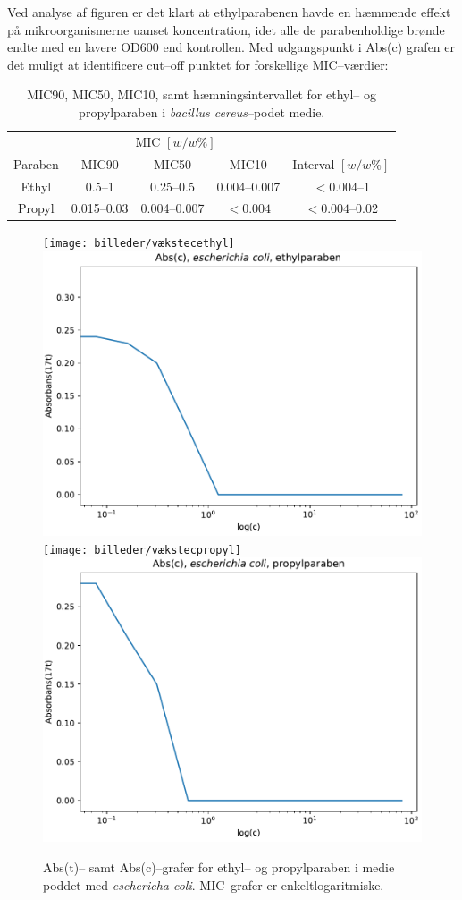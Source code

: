     Ved analyse af figuren er det klart at ethylparabenen havde en hæmmende effekt på mikroorganismerne uanset koncentration, idet alle de parabenholdige brønde endte med en lavere OD600 end kontrollen. Med udgangspunkt i Abs(c) grafen er det muligt at identificere cut--off punktet for forskellige MIC--værdier:
    \begin{table}[H]\centering
        \caption{MIC90, MIC50, MIC10, samt hæmningsintervallet for ethyl-- og propylparaben i \textit{bacillus cereus}--podet medie.}
        \begin{tabular}{ccccc}
            \toprule
            & \multicolumn{3}{c}{MIC $\left[\si{w\per w \%}\right]$} & \\
            \cmidrule(r){2-4}
            Paraben & MIC90 & MIC50 & MIC10 & Interval $\left[\si{w\per w \%}\right]$ \\
            \midrule
            Ethyl & 0.5--1 & 0.25--0.5 & 0.004--0.007 & $<0.004$--1 \\
            Propyl & 0.015--0.03 & 0.004--0.007 & $<0.004$ & $<0.004$--0.02 \\
            \bottomrule
        \end{tabular}
    \end{table}
    \begin{figure}[H]\centering
        \texttt{[image: billeder/vækstecethyl]}
        \includegraphics[width=.48\linewidth]{billeder/micecethyl}
        \texttt{[image: billeder/vækstecpropyl]}
        \includegraphics[width=.48\linewidth]{billeder/micecpropyl}
        \caption{Abs(t)-- samt Abs(c)--grafer for ethyl-- og propylparaben i medie poddet med \textit{eschericha coli}. MIC--grafer er enkeltlogaritmiske.}
    \end{figure}
